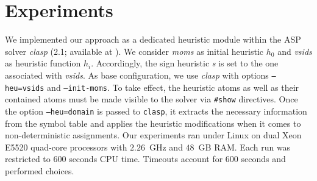
\section{Experiments}\label{sec:experiments}

We implemented our approach as a dedicated heuristic module within the ASP solver \textit{clasp}
(2.1; available at \cite{hclasp}).
We consider \textit{moms} \cite{pretolani96a} as initial heuristic $h_0$ and
\textit{vsids} \cite{momazhzhma01a} as heuristic function $h_i$.
Accordingly, the sign heuristic \textsl{s} is set to the one associated with \textit{vsids}.
As base configuration, we use \textit{clasp} with options \texttt{--heu=vsids} and \texttt{--init-moms}.
%
To take effect,
the heuristic atoms as well as their contained atoms must be made visible to the solver via \texttt{\#show} directives.
Once the option \texttt{--heu=domain} is passed to \texttt{clasp},
it extracts the necessary information from the symbol table and applies the heuristic modifications
when it comes to non-deterministic assignments.
%
Our experiments ran under Linux on dual Xeon E5520 quad-core processors with $2.26$~GHz and $48$~GB RAM.
Each run was restricted to 600 seconds CPU time.
Timeouts account for 600 seconds and performed choices.

